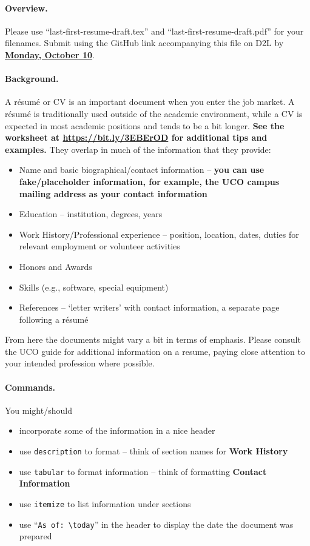 \documentclass[11pt]{article}
\newcommand{\compactlist}{\setlength{\itemsep}{0pt} \setlength{\parskip}{0pt} \setlength{\leftskip}{-1em}}
\begin{document}
\paragraph{Overview.} Please use ``last-first-resume-draft.tex'' and ``last-first-resume-draft.pdf'' for your filenames.  Submit using the GitHub link accompanying this file on D2L by \textbf{\underline{{Monday, October 10}}}.

\paragraph{Background.} A r\'esum\'e or CV is an important document when you enter the job market.  A r\'esum\'e is traditionally used outside of the academic environment, while a CV is expected in most academic positions and tends to be a bit longer.  \textbf{See the worksheet at \url{https://bit.ly/3EBErOD} for additional tips and examples.} They overlap in much of the information that they provide:
%
\begin{itemize} \compactlist
\item Name and basic biographical\slash contact information -- \textbf{you can use fake/placeholder information, for example, the UCO campus mailing address as your contact information}
\item Education -- institution, degrees, years
\item Work History\slash Professional experience -- position, location, dates, duties for relevant employment or volunteer activities
\item Honors and Awards
\item Skills (e.g., software, special equipment)
\item References -- `letter writers' with contact information, a separate page following a r\'esum\'e
\end{itemize}
%
From here the documents might vary a bit in terms of emphasis.  Please consult the UCO guide for additional information on a resume, paying close attention to your intended profession where possible.

\paragraph{Commands.} You might\slash should 
\begin{itemize}\compactlist
\item incorporate some of the information in a nice header
\item use \verb|description| to format -- think of section names for \textbf{Work History}
\item use \verb|tabular| to format information -- think of formatting \textbf{Contact Information}
\item use \verb|itemize| to list information under sections
\item use ``\verb|As of: \today|'' in the header to display the date the document was prepared
\end{itemize}
\end{document}
